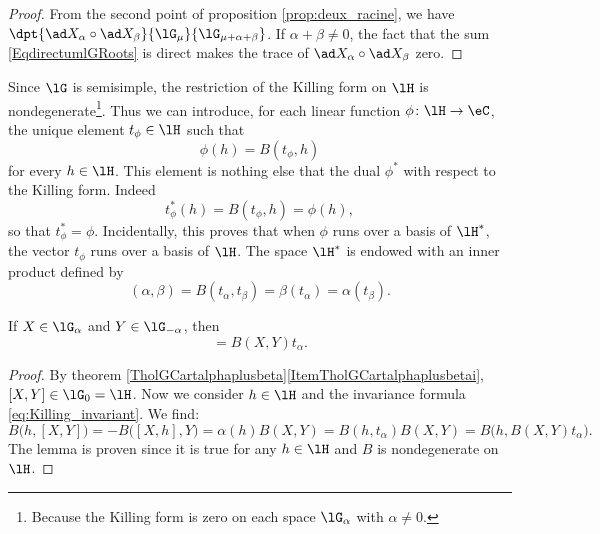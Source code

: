 \begin{proof}
    From the second point of proposition \ref{prop:deux_racine}, we have $\dpt{\ad X_{\alpha}\circ\ad X_{\beta}}{\lG_{\mu}}{\lG_{\mu+\alpha+\beta}}$. If $\alpha+\beta\neq 0$, the fact that the sum \eqref{EqdirectumlGRoots} is direct makes the trace of $\ad X_{\alpha}\circ\ad X_{\beta}$ zero.
\end{proof}


Since \( \lG\) is semisimple, the restriction of the Killing form on \( \lH\) is nondegenerate\footnote{Because the Killing form is zero on each space \( \lG_{\alpha}\) with \( \alpha\neq 0\).}. Thus we can introduce, for each linear function $\phi\colon \lH\to \eC$, the unique element $t_{\phi}\in\lH$ such that 
\begin{equation}
    \phi(h)=B(t_{\phi},h) 
\end{equation}
for every $h\in\lH$.  This element is nothing else that the dual \( \phi^*\) with respect to the Killing form. Indeed
\begin{equation}
    t_{\phi}^*(h)=B(t_{\phi},h)=\phi(h),
\end{equation}
so that \( t_{\phi}^*=\phi\). Incidentally, this proves that when \( \phi\) runs over a basis of \( \lH^*\), the vector \( t_{\phi}\) runs over a basis of \( \lH\). The space $\lH^*$ is endowed with an inner product defined by
\begin{equation}        \label{EqDefInnprHestrar}
    (\alpha,\beta) = B(t_{\alpha},t_{\beta})=\beta(t_{\alpha})=\alpha(t_{\beta}).
\end{equation}

\begin{lemma}       \label{LemXYBXYtalpha}\label{Propoxalphaymoinaalpha}
    If \( X\in\lG_{\alpha}\) and \( Y\in\lG_{-\alpha}\), then
    \begin{equation}
        [X,Y]=B(X,Y)t_{\alpha}.
    \end{equation}
\end{lemma}

\begin{proof}
    By theorem \ref{TholGCartalphaplusbeta}\ref{ItemTholGCartalphaplusbetai}, $[X,Y]\in\lG_0=\lH$. Now we consider $h\in\lH$ and the invariance formula \eqref{eq:Killing_invariant}. We find:
    \begin{equation}
        B\big( h,[X,Y] \big)=-B\big( [X,h],Y \big)=\alpha(h)B(X,Y)=B(h,t_{\alpha})B(X,Y)=B\big(h,B(X,Y)t_{\alpha}\big).
    \end{equation}
    The lemma is proven since it is true for any $h\in\lH$ and $B$ is nondegenerate on $\lH$. 
\end{proof}

